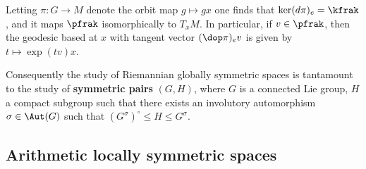 Letting $\pi : G \to M$ denote the orbit map $g \mapsto gx$ one finds that $\ker (d\pi)_e = \kfrak$, and it maps $\pfrak$ isomorphically to $T_x M$.  In particular, if $v \in \pfrak$, then the geodesic based at $x$ with tangent vector $(\dop \pi)_e v$ is given by $t \mapsto \exp (t v) x$. %

Consequently the study of Riemannian globally symmetric spaces is tantamount to the study of \textbf{symmetric pairs} $(G,H)$, where $G$ is a connected Lie group, $H$ a compact subgroup such that there exists an involutory automorphism $\sigma \in \Aut(G)$ such that $(G^\sigma)^\circ \leq H \leq G^\sigma$.



\subsection{Arithmetic locally symmetric spaces}

